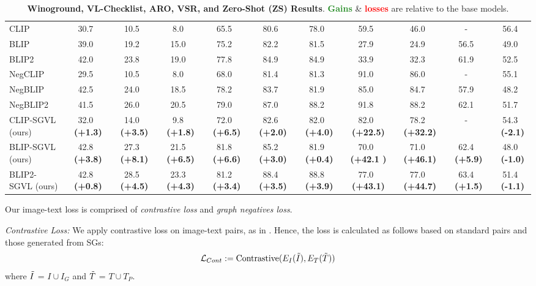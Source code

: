 \documentclass[11pt]{article}
\newcommand{\Ig}{I_G}
\newcommand{\minisection}[1]{\noindent{\textbf{#1}.}}
\newcommand{\gcol}[1]{{\bf \fontsize{6.5}{42}\selectfont \color{citecolor!80}~(#1)}}
\newcommand{\rcol}[1]{{\bf \fontsize{6.5}{42}\selectfont \color{lightred!180}~(#1)}}
\newcommand\green[1]{\textcolor{forestgreen}{\textbf{#1}}}
\newcommand\red[1]{\textcolor{red}{\textbf{#1}}}
\begin{document}
\begin{table*}[t!]
\begin{small}
\begin{tabular}{l|ccc|ccc|cc|c|c}
            \midrule 
CLIP  & 30.7 &10.5 & 8.0  & 65.5 & 80.6 & 78.0 & 59.5 & 46.0 & - & 56.4\\
BLIP  &39.0 &19.2 & 15.0 & 75.2 & 82.2 & 81.5 & 27.9 & 24.9 & 56.5 &  49.0\\
            BLIP2 &42.0 &23.8 &19.0  &77.8  &84.9  &84.9  &33.9 &32.3 & 61.9 & 52.5 \\
\midrule 
            NegCLIP & 29.5 & 10.5 & 8.0  &68.0  &81.4  & 81.3 & 91.0  & 86.0  & - & 55.1 \\
            NegBLIP  &42.5 &24.0 &18.5  &78.2  &83.7  &81.9  & 85.0  & 84.7  & 57.9 & 48.2 \\
            NegBLIP2 & 41.5 & 26.0 & 20.5  & 79.0  &87.0  &88.2  &91.8   & 88.2 & 62.1  &51.7  \\
            \midrule
            CLIP-SGVL (ours) &32.0 \gcol{+1.3} &14.0 \gcol{+3.5} & 9.8 \gcol{+1.8}  & 72.0 \gcol{+6.5} & 82.6 \gcol{+2.0} & 82.0 \gcol{+4.0} & 82.0 \gcol{+22.5} & 78.2 \gcol{+32.2} & - &  54.3 \rcol{-2.1}\\
            BLIP-SGVL (ours) &42.8 \gcol{+3.8} &27.3 \gcol{+8.1} & 21.5 \gcol{+6.5} & 81.8 \gcol{+6.6} & 85.2 \gcol{+3.0} & 81.9 \gcol{+0.4} & 70.0 \gcol{+42.1 } & 71.0 \gcol{+46.1} & 62.4 \gcol{+5.9} &  48.0 \rcol{-1.0}\\
            BLIP2-SGVL (ours) &42.8 \gcol{+0.8} &28.5 \gcol{+4.5} &23.3 \gcol{+4.3}  & 81.2 \gcol{+3.4}  &88.4 \gcol{+3.5}  &88.8 \gcol{+3.9}  &77.0 \gcol{+43.1}  &77.0 \gcol{+44.7}  & 63.4 \gcol{+1.5} &51.4 \rcol{-1.1}  \\
            \bottomrule        
    \end{tabular}
    \end{small}
    \vspace{-1.0em}
    \caption{
    \textbf{Winoground, VL-Checklist, ARO, VSR, and Zero-Shot (ZS) Results}. \green{Gains} \& \red{losses} are relative to the base models.}
    \vspace{-1.5em}
    \label{tab:res_main}
\end{table*} 
\minisection{Image-Text Loss}
Our image-text loss is comprised of \textit{contrastive loss} and \textit{graph negatives loss}. 

\noindent \textit{Contrastive Loss:} We apply contrastive loss on image-text pairs, as in \citet{radford2021learning}. Hence, the loss is calculated as follows based on standard pairs and those generated from SGs:
\begin{equation} 
\mathcal{L}_{Cont} := \text{Contrastive}(E_I(\Tilde{I}),E_T(\Tilde{T}))
\end{equation} 
where $\Tilde{I}$ = $I \cup \Ig$ and $\Tilde{T}$ = $T  \cup T_P$.
\end{document}
